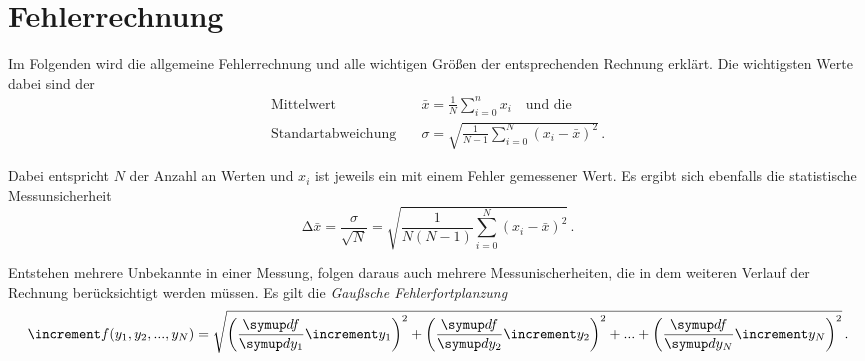 \section{Fehlerrechnung}
\label{sec:Fehlerrechnung}

Im Folgenden wird die allgemeine Fehlerrechnung und alle wichtigen Größen der entsprechenden Rechnung erklärt.
Die wichtigsten Werte dabei sind der 
\begin{align}
    \text{Mittelwert} \quad & \bar{x}  = \frac{1}{N} \sum_{i=0}^{n} x_i \quad \text{und die} \label{eq:mittelwert} \\
    \text{Standartabweichung} \quad & \sigma  = \sqrt{\frac{1}{N - 1 } \sum_{i=0}^{N} (x_i -  \bar{x})^2} \, . \label{eq:standartabweichung}
\end{align}

Dabei entspricht $N$ der Anzahl an Werten und $x_i$ ist jeweils ein mit einem Fehler gemessener Wert.
Es ergibt sich ebenfalls die statistische Messunsicherheit
\begin{equation}
    \increment \bar{x} = \frac{\sigma}{\sqrt{N}} = 
    \sqrt{\frac{1}{N(N - 1)} \sum_{i=0}^{N} (x_i -  \bar{x})^2} \, . \label{eq:messunsicherheit}
\end{equation} 

Entstehen mehrere Unbekannte in einer Messung, folgen daraus auch mehrere Messunischerheiten,
die in dem weiteren Verlauf der Rechnung berücksichtigt werden müssen.
Es gilt die \textit{Gaußsche Fehlerfortplanzung}
\begin{equation}
    \increment f(y_1 ,y_2 ,...,y_N ) = \sqrt{\left(\frac{\dif{f}}{\dif{y_{1}}} \increment y_{1}\right)^2
    + \left(\frac{\dif{f}}{\dif{y_{2}}} \increment y_{2}\right)^2 + ... + 
    \left(\frac{\dif{f}}{\dif{y_{N}}} \increment y_{N}\right)^2
    } \, . \label{eq:fehlerfortplanzung}
\end{equation}